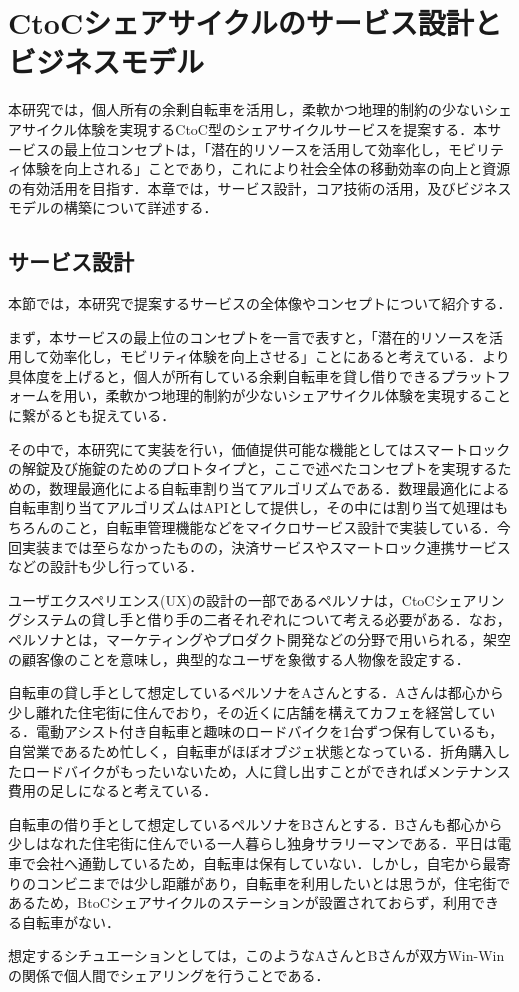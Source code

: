 \section{CtoCシェアサイクルのサービス設計とビジネスモデル}
  \label{sec:CtoCシェアサイクルのサービス設計とビジネスモデル}
    \par 本研究では，個人所有の余剰自転車を活用し，柔軟かつ地理的制約の少ないシェアサイクル体験を実現するCtoC型のシェアサイクルサービスを提案する．本サービスの最上位コンセプトは，「潜在的リソースを活用して効率化し，モビリティ体験を向上される」ことであり，これにより社会全体の移動効率の向上と資源の有効活用を目指す．本章では，サービス設計，コア技術の活用，及びビジネスモデルの構築について詳述する．
      
  \subsection{サービス設計}
    \label{sec:サービス設計}
      \par 本節では，本研究で提案するサービスの全体像やコンセプトについて紹介する．
      \par まず，本サービスの最上位のコンセプトを一言で表すと，「潜在的リソースを活用して効率化し，モビリティ体験を向上させる」ことにあると考えている．より具体度を上げると，個人が所有している余剰自転車を貸し借りできるプラットフォームを用い，柔軟かつ地理的制約が少ないシェアサイクル体験を実現することに繋がるとも捉えている．
      \par その中で，本研究にて実装を行い，価値提供可能な機能としてはスマートロックの解錠及び施錠のためのプロトタイプと，ここで述べたコンセプトを実現するための，数理最適化による自転車割り当てアルゴリズムである．数理最適化による自転車割り当てアルゴリズムはAPIとして提供し，その中には割り当て処理はもちろんのこと，自転車管理機能などをマイクロサービス設計で実装している．今回実装までは至らなかったものの，決済サービスやスマートロック連携サービスなどの設計も少し行っている．
      \par ユーザエクスペリエンス(UX)の設計の一部であるペルソナは，CtoCシェアリングシステムの貸し手と借り手の二者それぞれについて考える必要がある．なお，ペルソナとは，マーケティングやプロダクト開発などの分野で用いられる，架空の顧客像のことを意味し，典型的なユーザを象徴する人物像を設定する．
      \par 自転車の貸し手として想定しているペルソナをAさんとする．Aさんは都心から少し離れた住宅街に住んでおり，その近くに店舗を構えてカフェを経営している．電動アシスト付き自転車と趣味のロードバイクを1台ずつ保有しているも，自営業であるため忙しく，自転車がほぼオブジェ状態となっている．折角購入したロードバイクがもったいないため，人に貸し出すことができればメンテナンス費用の足しになると考えている．
      \par 自転車の借り手として想定しているペルソナをBさんとする．Bさんも都心から少しはなれた住宅街に住んでいる一人暮らし独身サラリーマンである．平日は電車で会社へ通勤しているため，自転車は保有していない．しかし，自宅から最寄りのコンビニまでは少し距離があり，自転車を利用したいとは思うが，住宅街であるため，BtoCシェアサイクルのステーションが設置されておらず，利用できる自転車がない．
      \par 想定するシチュエーションとしては，このようなAさんとBさんが双方Win-Winの関係で個人間でシェアリングを行うことである．
  
